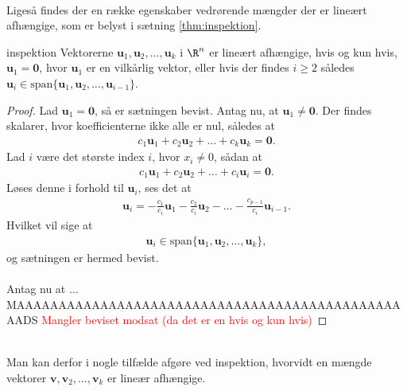 \\
%
%
Ligeså findes der en række egenskaber vedrørende mængder der er lineært afhængige, som er belyst i sætning \ref{thm:inspektion}.
%
%
\begin{thm}{}{inspektion}
%
Vektorerne $\mathbf{u}_1,\mathbf{u}_2, \ldots ,\mathbf{u}_k$ i $\R^n$ er lineært afhængige, 
hvis og kun hvis, $\mathbf{u}_1=\mathbf{0}$, hvor $\mathbf{u}_1$ er en vilkårlig vektor, 
eller hvis der findes $i \geq 2$ således $\mathbf{u}_i \in \text{span} \{ \mathbf{u}_1,\mathbf{u}_2, \ldots ,\mathbf{u}_{i-1} \}$.
%
\end{thm}
%
%
\begin{proof}
%
Lad $\mathbf{u}_1=\mathbf{0}$, så er sætningen bevist. 
Antag nu, at $\mathbf{u}_1 \neq \mathbf{0}$. 
Der findes skalarer, hvor koefficienterne ikke alle er nul, således at
% 
\begin{align*}
c_1 \mathbf{u}_1 + c_2 \mathbf{u}_2 + \ldots + c_k \mathbf{u}_k = \mathbf{0}.
\end{align*}
%
Lad $i$ være det største index $i$, hvor $x_i \neq 0$, sådan at 
\begin{align*}
c_1 \mathbf{u}_1 + c_2 \mathbf{u}_2 + \ldots + c_i \mathbf{u}_i = \mathbf{0}.
\end{align*}
Løses denne i forhold til $\mathbf{u}_i$, ses det at
\begin{align*}
\mathbf{u}_i = - \frac{c_1}{c_i} \mathbf{u}_1 - \frac{c_2}{c_i} \mathbf{u}_2 - \ldots - \frac{c_{p-1}}{c_i} \mathbf{u}_{i-1}.
\end{align*}
Hvilket vil sige at 
\begin{align*}
\mathbf{u}_i \in \text{span}\{ \mathbf{u}_1,\mathbf{u}_2, \ldots ,\mathbf{u}_k \},
\end{align*}
%
og sætningen er hermed bevist.
%
\\\\
Antag nu at $\ldots$ MAAAAAAAAAAAAAAAAAAAAAAAAAAAAAAAAAAAAAAAAAAAAAAAADS
\textcolor{red}{Mangler beviset modsat (da det er en hvis og kun hvis)}
%
\end{proof}
\\
%
%
Man kan derfor i nogle tilfælde afgøre ved inspektion, hvorvidt en mængde vektorer $\mathbf{v},\mathbf{v}_2,\ldots ,\mathbf{v}_k$ er lineær afhængige. 
